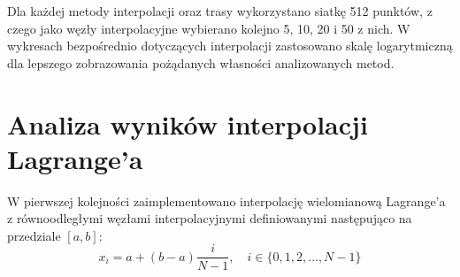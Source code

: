 \documentclass[a4paper,12pt]{article}
\begin{document}
  \begin{figure}[H]
    \centering
  \end{figure}
  \par Dla każdej metody interpolacji oraz trasy wykorzystano siatkę 512 punktów, z czego jako węzły interpolacyjne wybierano kolejno 5, 10, 20 i 50 z nich. W wykresach bezpośrednio dotyczących interpolacji zastosowano skalę logarytmiczną dla lepszego zobrazowania pożądanych własności analizowanych metod.
  
\section{Analiza wyników interpolacji Lagrange'a}
	W pierwszej kolejności zaimplementowano interpolację wielomianową Lagrange'a z równoodległymi węzłami interpolacyjnymi definiowanymi następująco na przedziale $[a, b]$:
		\begin{equation}
	x_i = a + (b-a)\frac{i}{N-1}, \quad i \in \{0, 1, 2, \dots, N-1\}
	\end{equation}
	
\end{document}
